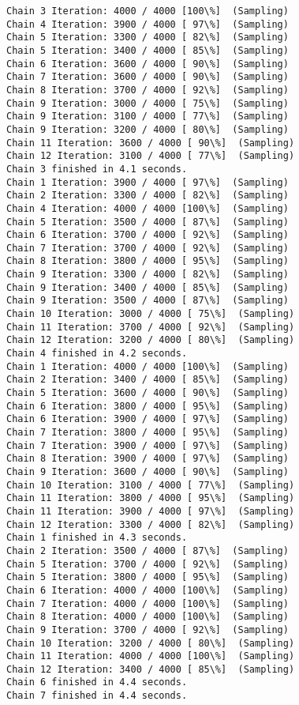 \documentclass[11pt]{article}
\begin{document}
\begin{Verbatim}[commandchars=\\\{\}]
Chain 3 Iteration: 4000 / 4000 [100\%]  (Sampling)
Chain 4 Iteration: 3900 / 4000 [ 97\%]  (Sampling)
Chain 5 Iteration: 3300 / 4000 [ 82\%]  (Sampling)
Chain 5 Iteration: 3400 / 4000 [ 85\%]  (Sampling)
Chain 6 Iteration: 3600 / 4000 [ 90\%]  (Sampling)
Chain 7 Iteration: 3600 / 4000 [ 90\%]  (Sampling)
Chain 8 Iteration: 3700 / 4000 [ 92\%]  (Sampling)
Chain 9 Iteration: 3000 / 4000 [ 75\%]  (Sampling)
Chain 9 Iteration: 3100 / 4000 [ 77\%]  (Sampling)
Chain 9 Iteration: 3200 / 4000 [ 80\%]  (Sampling)
Chain 11 Iteration: 3600 / 4000 [ 90\%]  (Sampling)
Chain 12 Iteration: 3100 / 4000 [ 77\%]  (Sampling)
Chain 3 finished in 4.1 seconds.
Chain 1 Iteration: 3900 / 4000 [ 97\%]  (Sampling)
Chain 2 Iteration: 3300 / 4000 [ 82\%]  (Sampling)
Chain 4 Iteration: 4000 / 4000 [100\%]  (Sampling)
Chain 5 Iteration: 3500 / 4000 [ 87\%]  (Sampling)
Chain 6 Iteration: 3700 / 4000 [ 92\%]  (Sampling)
Chain 7 Iteration: 3700 / 4000 [ 92\%]  (Sampling)
Chain 8 Iteration: 3800 / 4000 [ 95\%]  (Sampling)
Chain 9 Iteration: 3300 / 4000 [ 82\%]  (Sampling)
Chain 9 Iteration: 3400 / 4000 [ 85\%]  (Sampling)
Chain 9 Iteration: 3500 / 4000 [ 87\%]  (Sampling)
Chain 10 Iteration: 3000 / 4000 [ 75\%]  (Sampling)
Chain 11 Iteration: 3700 / 4000 [ 92\%]  (Sampling)
Chain 12 Iteration: 3200 / 4000 [ 80\%]  (Sampling)
Chain 4 finished in 4.2 seconds.
Chain 1 Iteration: 4000 / 4000 [100\%]  (Sampling)
Chain 2 Iteration: 3400 / 4000 [ 85\%]  (Sampling)
Chain 5 Iteration: 3600 / 4000 [ 90\%]  (Sampling)
Chain 6 Iteration: 3800 / 4000 [ 95\%]  (Sampling)
Chain 6 Iteration: 3900 / 4000 [ 97\%]  (Sampling)
Chain 7 Iteration: 3800 / 4000 [ 95\%]  (Sampling)
Chain 7 Iteration: 3900 / 4000 [ 97\%]  (Sampling)
Chain 8 Iteration: 3900 / 4000 [ 97\%]  (Sampling)
Chain 9 Iteration: 3600 / 4000 [ 90\%]  (Sampling)
Chain 10 Iteration: 3100 / 4000 [ 77\%]  (Sampling)
Chain 11 Iteration: 3800 / 4000 [ 95\%]  (Sampling)
Chain 11 Iteration: 3900 / 4000 [ 97\%]  (Sampling)
Chain 12 Iteration: 3300 / 4000 [ 82\%]  (Sampling)
Chain 1 finished in 4.3 seconds.
Chain 2 Iteration: 3500 / 4000 [ 87\%]  (Sampling)
Chain 5 Iteration: 3700 / 4000 [ 92\%]  (Sampling)
Chain 5 Iteration: 3800 / 4000 [ 95\%]  (Sampling)
Chain 6 Iteration: 4000 / 4000 [100\%]  (Sampling)
Chain 7 Iteration: 4000 / 4000 [100\%]  (Sampling)
Chain 8 Iteration: 4000 / 4000 [100\%]  (Sampling)
Chain 9 Iteration: 3700 / 4000 [ 92\%]  (Sampling)
Chain 10 Iteration: 3200 / 4000 [ 80\%]  (Sampling)
Chain 11 Iteration: 4000 / 4000 [100\%]  (Sampling)
Chain 12 Iteration: 3400 / 4000 [ 85\%]  (Sampling)
Chain 6 finished in 4.4 seconds.
Chain 7 finished in 4.4 seconds.

\end{Verbatim}
\end{document}

